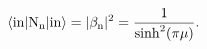 \begin{equation}
\langle \rm{in}| N_n | \mathrm{\rm{in}} \rangle = |\beta_n|^2 = \frac{1}{\sinh ^2 (\pi \mu) } .
\end{equation}

